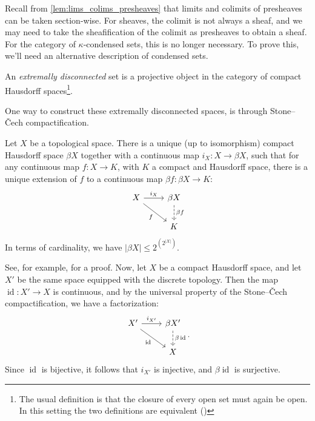 \documentclass{article}
\DeclareMathOperator{\id}{id}
\begin{document}
\medskip
Recall from \cref{lem:lims_colims_presheaves} that limits and colimits
of presheaves can be taken section-wise. For sheaves, the colimit is
not always a sheaf, and we may need to take the sheafification of the
colimit as presheaves to obtain a sheaf. For the category of
$\kappa$-condensed sets, this is no longer necessary. To
prove this, we'll need an alternative description of condensed sets.
\begin{definition}
    An \emph{extremally disconnected} set is a projective object
    in the category of compact Hausdorff spaces\footnote{
        The usual definition is that the closure of
        every open set must again be open. In this setting
        the two definitions are equivalent
        (\cite[Theorem 2.5]{Gle1958ProjectiveTS})}.
\end{definition}
One way to construct these extremally disconnected spaces, is
through Stone--\v{C}ech compactification.
\begin{theorem}
    Let $X$ be a topological space. There is a unique (up to isomorphism)
    compact Hausdorff space $\beta X$ together with a continuous map
    $i_X \colon X \to \beta X$, such that for any continuous map
    $f \colon X \to K$, with $K$ a compact and Hausdorff space, there is
    a unique extension of $f$ to a continuous map $\beta f \colon \beta X \to K$:
    \begin{equation*}
        \begin{tikzcd}
            X \rar["i_X"] \ar[rd, "f"'] & \beta X  \dar[dashed, "\beta f"]\\
            & K
        \end{tikzcd}
    \end{equation*}
    In terms of cardinality, we have $|\beta X| \leq 2^{\left(2^{|X|}\right)}$.
\end{theorem}
See, for example, \cite[\href{https://stacks.math.columbia.edu/tag/0908}{Section 0908}]{stacks-project}
for a proof. Now, let $X$ be a compact Hausdorff space,
and let $X'$ be the same space equipped with the discrete topology.
Then the map $\id \colon X' \to X$ is continuous, and by
the universal property of the Stone--\v{C}ech compactification,
we have a factorization:
\begin{equation*}
    \begin{tikzcd}
        X' \rar["i_{X'}"] \ar[rd, "\id"'] & \beta X ' \dar[dashed, "\beta \id"]\\
        & X
    \end{tikzcd}.
\end{equation*}
Since $\id$ is bijective, it follows
that $i_{X'}$ is injective, and $\beta \id$ is surjective.
\end{document}
